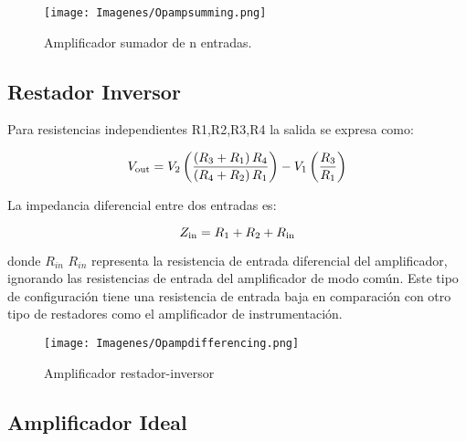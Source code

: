 \documentclass{article}
\begin{document}
\begin{figure}
    \centering
    \texttt{[image: Imagenes/Opampsumming.png]}
    \caption{Amplificador sumador de n entradas.\citep{AmplificadorOperacional}}
    \label{fig:opAmpSumming}
\end{figure}


\subsection{Restador Inversor}

Para resistencias independientes R1,R2,R3,R4 la salida se expresa como:\citep{AmplificadorOperacional}

\begin{equation}[h!]
    {\displaystyle V_{\mathrm {out} }=V_{2}\left({\left(R_{3}+R_{1}\right)R_{4} \over \left(R_{4}+R_{2}\right)R_{1}}\right)-V_{1}\left({R_{3} \over R_{1}}\right)}
\end{equation}

La impedancia diferencial entre dos entradas es:

\begin{equation}
{\displaystyle Z_{\rm {in}}=R_{1}+R_{2}+R_{\rm {in}}}
\end{equation}

donde ${\displaystyle R_{in}}$ ${\displaystyle R_{in}}$ representa la resistencia de entrada diferencial del amplificador, ignorando las resistencias de entrada del amplificador de modo común. Este tipo de configuración tiene una resistencia de entrada baja en comparación con otro tipo de restadores como el amplificador de instrumentación.\citep{AmplificadorOperacional}

\begin{figure}[h!]
    \centering
    \texttt{[image: Imagenes/Opampdifferencing.png]}
    \caption{Amplificador restador-inversor\citep{AmplificadorOperacional}}
    \label{fig:my_label}
\end{figure}



   



\subsection{Amplificador Ideal}
\end{document}
